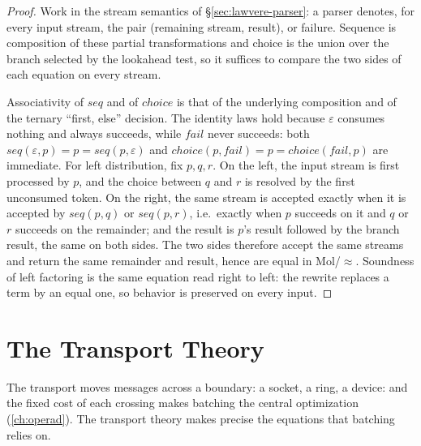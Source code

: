 \begin{proof}
Work in the stream semantics of \S\ref{sec:lawvere-parser}: a parser
denotes, for every input stream, the pair (remaining stream, result), or
failure. Sequence is composition of these partial transformations and
choice is the union over the branch selected by the lookahead test, so it
suffices to compare the two sides of each equation on every stream.

Associativity of $\mathit{seq}$ and of $\mathit{choice}$ is that of the
underlying composition and of the ternary ``first, else'' decision. The
identity laws hold because $\varepsilon$ consumes nothing and always
succeeds, while $\mathit{fail}$ never succeeds: both
$\mathit{seq} (\varepsilon,p) = p = \mathit{seq} (p,\varepsilon)$ and
$\mathit{choice} (p,\mathit{fail}) = p = \mathit{choice} (\mathit{fail},p)$
are immediate. For left distribution, fix $p,q,r$. On the left, the input
stream is first processed by $p$, and the choice between $q$ and $r$ is
resolved by the first unconsumed token. On the right, the same stream is
accepted exactly when it is accepted by $\mathit{seq} (p,q)$ or
$\mathit{seq} (p,r)$, i.e.\ exactly when $p$ succeeds on it and $q$ or $r$
succeeds on the remainder; and the result is $p$'s result followed by the
branch result, the same on both sides. The two sides therefore accept the
same streams and return the same remainder and result, hence are equal in
Mol/$\approx$. Soundness of left factoring is the same equation read right
to left: the rewrite replaces a term by an equal one, so behavior is
preserved on every input.
\end{proof}

\section{The Transport Theory}\label{sec:lawvere-transport}

The transport moves messages across a boundary: a socket, a ring, a
device: and the fixed cost of each crossing makes batching the central
optimization (\autoref{ch:operad}). The transport theory makes precise the
equations that batching relies on.


